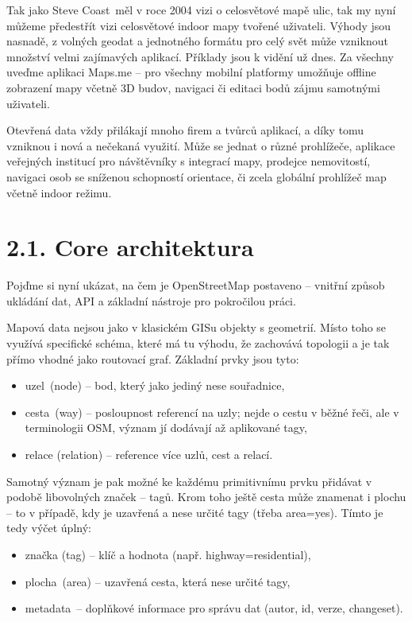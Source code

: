 Tak jako Steve Coast~měl v roce 2004 vizi o celosvětové mapě ulic, tak my nyní můžeme předestřít vizi celosvětové indoor mapy tvořené uživateli. Výhody jsou nasnadě, z volných geodat a jednotného formátu pro celý svět může vzniknout množství velmi zajímavých aplikací. Příklady jsou k vidění už dnes. Za všechny uveďme aplikaci Maps.me -- pro všechny mobilní platformy umožňuje offline zobrazení mapy včetně 3D budov, navigaci či editaci bodů zájmu samotnými uživateli.

Otevřená data vždy přilákají mnoho firem a tvůrců aplikací, a díky tomu vzniknou i nová a nečekaná využití. Může se jednat o různé prohlížeče, aplikace veřejných institucí pro návštěvníky s integrací mapy, prodejce nemovitostí, navigaci osob se sníženou schopností orientace, či zcela globální prohlížeč map včetně indoor režimu.

\section{2.1. Core architektura}\label{core-architektura}

Pojďme si nyní ukázat, na čem je OpenStreetMap postaveno -- vnitřní způsob ukládání dat, API a základní nástroje pro pokročilou práci.

Mapová data nejsou jako v klasickém GISu objekty s geometrií. Místo toho se využívá specifické schéma, které má tu výhodu, že zachovává topologii a je tak přímo vhodné jako routovací graf. Základní prvky jsou tyto:

\begin{itemize}
\tightlist
\item
  uzel~(node) -- bod, který jako jediný nese souřadnice,
\item
  cesta~(way) -- posloupnost referencí na uzly; nejde o cestu v běžné řeči, ale v terminologii OSM, význam jí dodávají až aplikované tagy, ~
\item
  relace (relation) -- reference více uzlů, cest a relací.
\end{itemize}

Samotný význam je pak možné ke každému primitivnímu prvku přidávat v podobě libovolných značek -- tagů. Krom toho ještě cesta může znamenat i plochu -- to v případě, kdy je uzavřená a nese určité tagy (třeba area=yes). Tímto je tedy výčet úplný:

\begin{itemize}
\tightlist
\item
  značka (tag) -- klíč a hodnota (např. highway=residential),
\item
  plocha~(area) -- uzavřená cesta, která nese určité tagy,
\item
  metadata~-- doplňkové informace pro správu dat (autor, id, verze, changeset).
\end{itemize}

